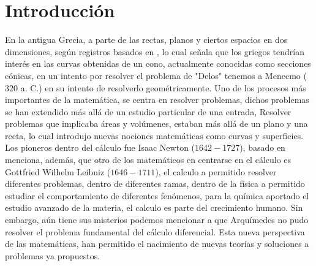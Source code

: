 \chapter{Introducción}
En la antigua Grecia, a parte de las rectas, planos y ciertos espacios en dos dimensiones, según registros basados en \cite{flores_1970}, lo cual señala que los griegos tendrían interés en las curvas obtenidas de un cono, actualmente conocidas como secciones cónicas, en un intento por resolver el problema de "Delos" tenemos a Menecmo ($320$ a. C.) en su intento de resolverlo geométricamente. Uno de los procesos más importantes de la matemática, se centra en resolver problemas, dichos problemas se han extendido más allá de un estudio particular de una entrada, Resolver problemas que implicaba áreas y volúmenes, estaban más allá de un plano y una recta, lo cual introdujo nuevas nociones matemáticas como curvas y superficies. Los pioneros dentro del cálculo fue Isaac Newton ($1642-1727$), basado en \cite{zill1} menciona, además, que otro de los matemáticos en centrarse en el cálculo es Gottfried Wilhelm Leibniz ($1646-1711$), el calculo a permitido resolver diferentes problemas, dentro de diferentes ramas, dentro de la física a permitido estudiar el comportamiento de diferentes fenómenos, para la química aportado el estudio avanzado de la materia, el calculo es parte del crecimiento humano. Sin embargo, aún tiene sus misterios podemos mencionar a que Arquímedes no pudo resolver el problema fundamental del cálculo diferencial. Esta nueva perspectiva de las matemáticas, han permitido el nacimiento de nuevas teorías y soluciones a problemas ya propuestos.
